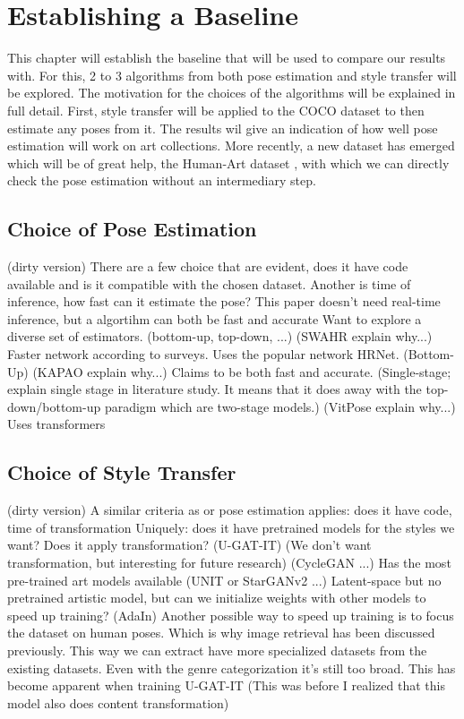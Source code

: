 \chapter{Establishing a Baseline}
\label{chap:baseline}
This chapter will establish the baseline that will be used to compare our results with.
For this, 2 to 3 algorithms from both pose estimation and style transfer will be explored.
The motivation for the choices of the algorithms will be explained in full detail.
First, style transfer will be applied to the COCO dataset to then estimate any poses from it.
The results wil give an indication of how well pose estimation will work on art collections.
More recently, a new dataset has emerged which will be of great help, the Human-Art dataset \cite{Ju2023}, with which we can directly check the pose estimation without an intermediary step.

\section{Choice of Pose Estimation}
\label{sec:baseline_pose_estimation}
(dirty version)
There are a few choice that are evident, does it have code available and is it compatible with the chosen dataset.
Another is time of inference, how fast can it estimate the pose? This paper doesn't need real-time inference, but a algortihm can both be fast and accurate \cite{William2021}
Want to explore a diverse set of estimators. (bottom-up, top-down, ...)
(SWAHR explain why...) \cite{SWARH} Faster network according to surveys. Uses the popular network HRNet. (Bottom-Up)
(KAPAO explain why...) \cite{William2021} Claims to be both fast and accurate. (Single-stage; explain single stage in literature study. It means that it does away with the top-down/bottom-up paradigm which are two-stage models.)
(VitPose explain why...) \cite{vitpose} Uses transformers

\section{Choice of Style Transfer}
\label{sec:baseline_style_transfer}
(dirty version)
A similar criteria as or pose estimation applies: does it have code, time of transformation
Uniquely: does it have pretrained models for the styles we want?
Does it apply transformation? (U-GAT-IT) (We don't want transformation, but interesting for future research)
(CycleGAN ...) \cite{Zhu2017} Has the most pre-trained art models available
(UNIT or StarGANv2 ...) \cite{Liu2017} Latent-space but no pretrained artistic model, but can we initialize weights with other models to speed up training?
(AdaIn) 
Another possible way to speed up training is to focus the dataset on human poses.
Which is why image retrieval has been discussed previously.
This way we can extract have more specialized datasets from the existing datasets.
Even with the genre categorization it's still too broad.
This has become apparent when training U-GAT-IT (This was before I realized that this model also does content transformation)

